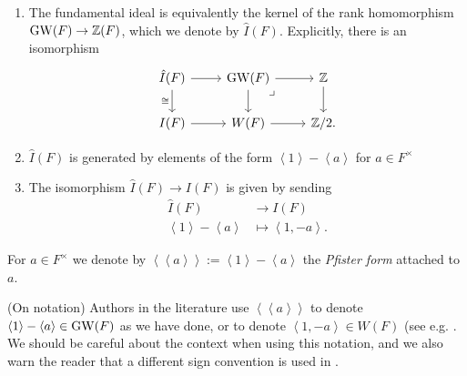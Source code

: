 \documentclass[11pt,openany]{book}
\newcommand{\Pfister}[1]{\left\langle\! \left\langle #1 \right\rangle\! \right\rangle}
\begin{document}
\begin{proposition} $\ $
\begin{enumerate}
    \item The fundamental ideal is equivalently the kernel of the rank homomorphism $\mathrm{GW}(F) \to \mathbb{Z}(F)$, which we denote by $\hat{I}(F)$. Explicitly, there is an isomorphism
\[ \begin{tikzcd}
    \hat{I}(F)\rar\dar["\cong" left] & \GW(F)\rar\dar\pb & \Z\dar\\
    I(F) \rar & W(F)\rar & \Z/2.
\end{tikzcd} \]

\item $\hat{I}(F)$ is generated by elements of the form $\left\langle 1 \right\rangle - \left\langle a \right\rangle$ for $a\in F^\times$

\item The isomorphism $\hat{I}(F) \to I(F)$ is given by sending
\begin{align*}
    \hat{I}(F) &\to I(F) \\
    \left\langle 1 \right\rangle - \left\langle a \right\rangle &\mapsto \left\langle 1,-a \right\rangle.
\end{align*}
\end{enumerate}
\end{proposition}

\begin{definition} For $a \in F^\times$ we denote by $\Pfister{a}:= \left\langle 1 \right\rangle - \left\langle a \right\rangle$ the \textit{Pfister form} attached to $a$.
\end{definition}

\begin{remark} (On notation) Authors in the literature use $\Pfister{a}$ to denote $\left\langle 1 \right\rangle - \left\langle a \right\rangle \in \mathrm{GW}(F)$ as we have done, or to denote $\left\langle 1,-a \right\rangle\in W(F)$ (see e.g. \cite[p.~24]{EKM}. We should be careful about the context when using this notation, and we also warn the reader that a different sign convention is used in \cite[X.1.1]{Lam}.
\end{remark}
\end{document}
